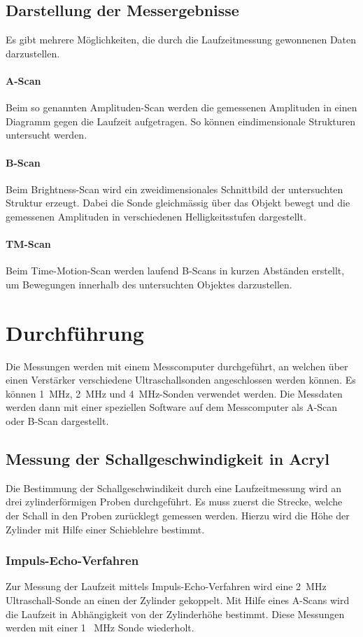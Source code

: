 \documentclass[11pt,ngerman,a4paper]{article}
\begin{document}
\subsection{Darstellung der Messergebnisse}
Es gibt mehrere M\"oglichkeiten, die durch die Laufzeitmessung gewonnenen Daten darzustellen.
\paragraph{A-Scan} Beim so genannten Amplituden-Scan werden die gemessenen Amplituden in einen Diagramm gegen die Laufzeit aufgetragen. So k\"onnen eindimensionale Strukturen untersucht werden. 
\paragraph{B-Scan}
Beim Brightness-Scan wird ein zweidimensionales Schnittbild der untersuchten Struktur erzeugt. Dabei die Sonde gleichm\"assig \"uber das Objekt bewegt und die gemessenen Amplituden in verschiedenen Helligkeitsstufen dargestellt.  
\paragraph{TM-Scan} Beim Time-Motion-Scan werden laufend B-Scans in kurzen Abst\"anden erstellt, um Bewegungen innerhalb des untersuchten Objektes darzustellen.

\section{Durchf\"uhrung }
Die Messungen werden mit einem Messcomputer durchgeführt, an welchen über einen Verstärker verschiedene Ultraschallsonden angeschlossen werden können. Es können \SI{1}{\mega\hertz}, \SI{2}{\mega  \hertz} und \SI{4}{\mega\hertz}-Sonden verwendet werden. Die Messdaten werden dann mit einer speziellen Software auf dem Messcomputer als A-Scan oder B-Scan dargestellt.
\subsection{Messung der Schallgeschwindigkeit in Acryl}
Die Bestimmung der Schallgeschwindikeit durch eine Laufzeitmessung wird an drei zylinderf\"ormigen Proben durchgef\"uhrt. Es muss zuerst die Strecke, welche der Schall in den Proben zur\"ucklegt gemessen werden. Hierzu wird die H\"ohe der Zylinder mit Hilfe einer Schieblehre bestimmt.  
\subsubsection{Impuls-Echo-Verfahren}
Zur Messung der Laufzeit mittels Impuls-Echo-Verfahren wird eine \SI{2}{\mega\hertz} Ultraschall-Sonde an einen der Zylinder gekoppelt. Mit Hilfe eines A-Scans wird die Laufzeit in Abh\"angigkeit von der Zylinderh\"ohe bestimmt. Diese Messungen werden mit einer 1  \SI{}{\mega\hertz} Sonde wiederholt. 
\end{document}
